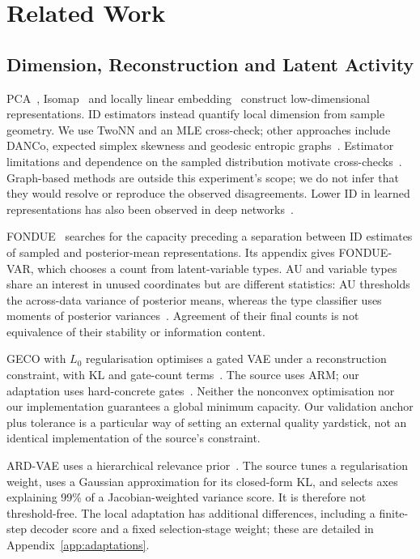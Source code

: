 \section{Related Work}\label{sec:related}

\subsection{Dimension, Reconstruction and Latent Activity}
PCA~\cite{tippingbishop1999ppca}, Isomap~\cite{tenenbaum2000isomap} and
locally linear embedding~\cite{roweis2000lle} construct low-dimensional
representations. ID estimators instead quantify local dimension from
sample geometry. We use TwoNN and an MLE cross-check; other approaches
include DANCo, expected simplex skewness and geodesic entropic
graphs~\cite{ceruti2014danco,johnsson2015ess,costa2004geodesic}.
Estimator limitations and dependence on the sampled distribution motivate
cross-checks~\cite{camastra2016intrinsic,allegra2020data}.
Graph-based methods are outside this experiment's scope; we do not infer
that they would resolve or reproduce the observed disagreements.
Lower ID in learned representations has also been observed in deep
networks~\cite{ansuini2019intrinsic,pope2021intrinsic}.

FONDUE~\cite{bonheme2022fondue} searches for the capacity preceding a
separation between ID estimates of sampled and posterior-mean
representations. Its appendix gives FONDUE-VAR, which chooses a count from
latent-variable types. AU and variable types share an interest in unused
coordinates but are different statistics: AU thresholds the across-data
variance of posterior means, whereas the type classifier uses moments of
posterior variances~\cite{bonheme2023active}. Agreement of their final
counts is not equivalence of their stability or information content.

GECO with $L_0$ regularisation optimises a gated VAE under a reconstruction
constraint, with KL and gate-count terms~\cite{deboom2020geco,rezende2018geco}.
The source uses ARM; our adaptation uses hard-concrete
gates~\cite{louizos2018l0}. Neither the nonconvex optimisation nor our
implementation guarantees a global minimum capacity. Our validation
anchor plus tolerance is a particular way of setting an external quality
yardstick, not an identical implementation of the source's constraint.

ARD-VAE uses a hierarchical relevance prior~\cite{saha2025ardvae}.
The source tunes a regularisation weight, uses a Gaussian approximation
for its closed-form KL, and selects axes explaining 99\% of a
Jacobian-weighted variance score. It is therefore not threshold-free.
The local adaptation has additional differences, including a finite-step
decoder score and a fixed selection-stage weight; these are detailed in
Appendix~\ref{app:adaptations}.

